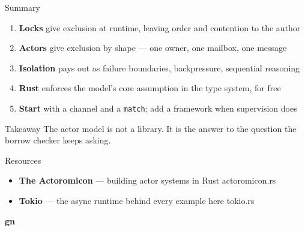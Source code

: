 \begin{frame}{Summary}
  \begin{enumerate}
    \item \textbf{Locks} give exclusion at runtime, leaving order and contention to the author
    \item \textbf{Actors} give exclusion by shape --- one owner, one mailbox, one message
    \item \textbf{Isolation} pays out as failure boundaries, backpressure, sequential reasoning
    \item \textbf{Rust} enforces the model's core assumption in the type system, for free
    \item \textbf{Start} with a channel and a \texttt{match}; add a framework when supervision does
  \end{enumerate}
  \vspace{-0.1cm}
  \begin{exampleblock}{Takeaway}
    The actor model is not a library. It is the answer to the question the
    borrow checker keeps asking.
  \end{exampleblock}
\end{frame}

\begin{frame}{Resources}
  \begin{itemize}
    \item \textbf{The Actoromicon} --- building actor systems in Rust
      \hfill \textcolor{stplmuted}{\small actoromicon.rs}
    \item \textbf{Tokio} --- the async runtime behind every example here
      \hfill \textcolor{stplmuted}{\small tokio.rs}
  \end{itemize}
\end{frame}

\begin{frame}[plain]
  \begin{center}
    \vfill
    {\Huge\bfseries\color{stplwhite} gn}
    \vfill
  \end{center}
\end{frame}


